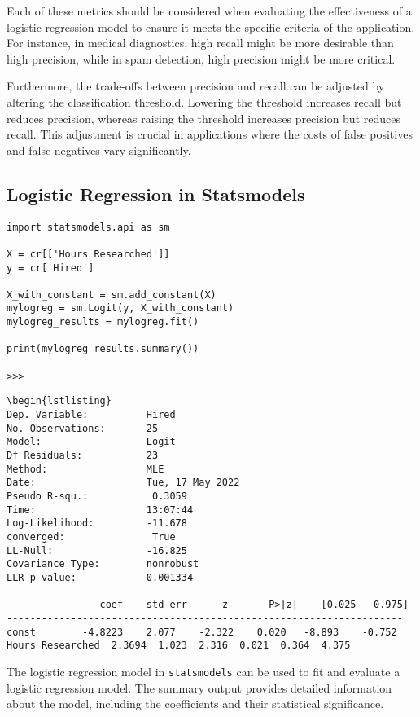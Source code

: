 \documentclass{article}
\theoremstyle{definition}
\theoremstyle{theorem}
\theoremstyle{theorem}
\theoremstyle{theorem}
\theoremstyle{theorem}
\theoremstyle{definition}
\theoremstyle{definition}
\theoremstyle{definition}
\theoremstyle{definition}
\theoremstyle{definition}
\begin{document}
Each of these metrics should be considered when evaluating the effectiveness of a logistic regression model to ensure it meets the specific criteria of the application. For instance, in medical diagnostics, high recall might be more desirable than high precision, while in spam detection, high precision might be more critical.

Furthermore, the trade-offs between precision and recall can be adjusted by altering the classification threshold. Lowering the threshold increases recall but reduces precision, whereas raising the threshold increases precision but reduces recall. This adjustment is crucial in applications where the costs of false positives and false negatives vary significantly.




\subsection{Logistic Regression in Statsmodels}

\begin{verbatim}
import statsmodels.api as sm

X = cr[['Hours Researched']]
y = cr['Hired']

X_with_constant = sm.add_constant(X)
mylogreg = sm.Logit(y, X_with_constant)
mylogreg_results = mylogreg.fit()

print(mylogreg_results.summary())

>>>

\end{verbatim}
\begin{lstlisting}
\begin{lstlisting}
Dep. Variable:          Hired
No. Observations:       25
Model:                  Logit
Df Residuals:           23
Method:                 MLE
Date:                   Tue, 17 May 2022
Pseudo R-squ.:           0.3059
Time:                   13:07:44
Log-Likelihood:         -11.678
converged:               True
LL-Null:                -16.825
Covariance Type:        nonrobust
LLR p-value:            0.001334

                coef    std err      z       P>|z|    [0.025   0.975]
--------------------------------------------------------------------
const        -4.8223    2.077    -2.322    0.020   -8.893    -0.752
Hours Researched  2.3694  1.023  2.316  0.021  0.364  4.375
\end{lstlisting}

The logistic regression model in \texttt{statsmodels} can be used to fit and evaluate a logistic regression model. The summary output provides detailed information about the model, including the coefficients and their statistical significance.
\end{document}

